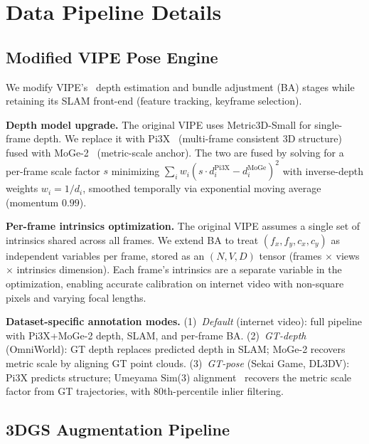 \documentclass{llmxive}
\begin{document}
\section{Data Pipeline Details}
\label{sec:appendix_data}




\subsection{Modified VIPE Pose Engine}
\label{sec:appendix_vipe}

We modify VIPE's~\citep{vipe} depth estimation and bundle adjustment (BA) stages while retaining its SLAM front-end (feature tracking, keyframe selection).

\noindent\textbf{Depth model upgrade.}
The original VIPE uses Metric3D-Small for single-frame depth.
We replace it with Pi3X~\citep{pi3x} (multi-frame consistent 3D structure) fused with MoGe-2~\citep{moge2} (metric-scale anchor).
The two are fused by solving for a per-frame scale factor $s$ minimizing $\sum_i w_i (s \cdot d^\text{Pi3X}_i - d^\text{MoGe}_i)^2$ with inverse-depth weights $w_i = 1/d_i$, smoothed temporally via exponential moving average (momentum $0.99$).

\noindent\textbf{Per-frame intrinsics optimization.}
The original VIPE assumes a single set of intrinsics shared across all frames.
We extend BA to treat $(f_x, f_y, c_x, c_y)$ as independent variables per frame, stored as an $(N, V, D)$ tensor (frames $\times$ views $\times$ intrinsics dimension).
Each frame's intrinsics are a separate variable in the optimization, enabling accurate calibration on internet video with non-square pixels and varying focal lengths.

\noindent\textbf{Dataset-specific annotation modes.}
(1)~\emph{Default} (internet video): full pipeline with Pi3X+MoGe-2 depth, SLAM, and per-frame BA.
(2)~\emph{GT-depth} (OmniWorld): GT depth replaces predicted depth in SLAM; MoGe-2 recovers metric scale by aligning GT point clouds.
(3)~\emph{GT-pose} (Sekai Game, DL3DV): Pi3X predicts structure; Umeyama Sim(3) alignment~\citep{umeyama} recovers the metric scale factor from GT trajectories, with 80th-percentile inlier filtering.

\subsection{3DGS Augmentation Pipeline}
\label{sec:appendix_3dgs}
\end{document}
